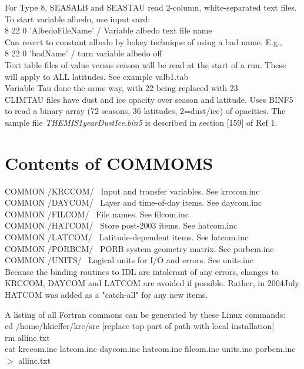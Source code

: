 \documentclass[draft]{article}  %
\newcommand{\qi}{\\ \hspace*{2.em}}      %
\newcommand{\nf}{\textit}  %
\begin{document}
For Type 8, SEASALB and SEASTAU read 2-column, white-separated text files. \\
To start variable albedo, use input card: 
\qi  8 22 0 'AlbedoFileName' / Variable albedo text file name \\
Can revert to constant albedo by hokey technique of using a bad name. E.g.,
\qi  8 22 0 'badName' / turn variable albedo off \\
Text table files of value versus season will be read at the start of a
run. These will apply to ALL latitudes. See example  valb1.tab   \\
Variable Tau done the same way, with 22 being replaced with 23 \\

CLIMTAU files have dust and ice opacity over season and latitude. Uses BINF5 to
read a binary array (72 seasons, 36 latitudes, 2=dust/ice) of opacities. The
sample file \nf{THEMIS1yearDustIce.bin5} is described in section [159] of Ref 1.
 
\section{Contents of COMMOMS } %
 COMMON /KRCCOM/ \ Input and transfer variables. See krccom.inc  \\ COMMON
 /DAYCOM/ \ Layer and time-of-day items. See daycom.inc  \\ COMMON /FILCOM/
 \ File names. See filcom.inc  \\ COMMON /HATCOM/ \ Store post-2003
 items. See hatcom.inc  \\ COMMON /LATCOM/ \ Latitude-dependent items. See
 latcom.inc  \\ COMMON /PORBCM/ \ PORB system geometry matrix.  See
 porbcm.inc  \\ COMMON /UNITS/ \ Logical units for I/O and errors.  See
 units.inc  \\


Because the binding routines to IDL are intolerant of any errors, changes to
KRCCOM, DAYCOM and LATCOM are avoided if possible. Rather, in 2004July HATCOM
was added as a "catch-all" for any new items.

A listing of all Fortran commons can be generated by these Linux commands: \\ 
cd /home/hkieffer/krc/src [replace top part of path with local installation] \\ 
rm allinc.txt \\ 
cat krccom.inc latcom.inc daycom.inc hatcom.inc filcom.inc units.inc porbcm.inc $>$ allinc.txt 
              
\end{document}
